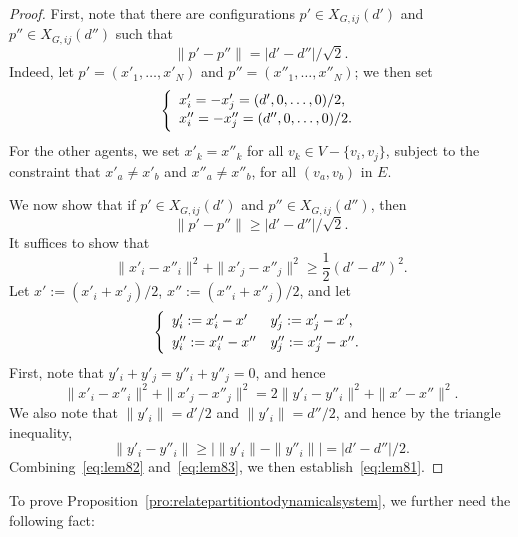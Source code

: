 \documentclass[10pt,twocolumn,twoside]{IEEEtran}
\renewcommand{\(}{\left (}
\renewcommand{\)}{\right )}
\renewcommand{\;}{\,;\,}
\begin{document}
\begin{proof}
First, note that there are configurations $p' \in X_{G,ij}(d')$ and $p''\in X_{G,ij}(d'')$ such that
\begin{equation*}\label{eq:equalitysatisfied}
\|p' - p''\| =  |d' - d''|/ \sqrt{2}.
\end{equation*} 
Indeed, let $p' = (x'_1,\ldots, x'_N)$ and $p'' = (x''_1,\ldots, x''_N)$; we then set
$$
\left\{
\begin{array}{l}
x'_i  =  -x'_j   =  (d', 0, \ldots, 0) / 2, \vspace{1pt}\\
x''_i  =  - x''_j =  (d'',0,\ldots,0) / 2.  \vspace{1pt}\\
\end{array}
\right.
$$ 
For the other agents, we set $x'_k  =  x''_k$  for all  $v_k \in V-\{v_i, v_j\}$, 
subject to the constraint that $x'_{a} \neq x'_{b}$ and $x''_{a}\neq x''_{b}$, for all $(v_{a},v_{b})$ in $E$.


We now show that if $p'\in X_{G,ij}(d')$ and $p'' \in X_{G,ij}(d'')$, then 
$$ \|p' - p''\| \ge |d' - d''|/ \sqrt{2}.$$ 
It suffices to show that 
\begin{equation}\label{eq:lem81}
 \|x'_i - x''_i\|^2 + \|x'_j - x''_j\|^2 \ge \frac{1}{2} (d' - d'')^2.
\end{equation}
Let $x':= (x'_i + x'_j) / 2$,  $x'':= (x''_i + x''_j) / 2$, 
and let 
$$
\left\{
\begin{array}{ll}
y'_i := x'_i - x' & y'_j := x'_j - x', \vspace{3pt}\\
y''_i := x''_i - x'' & y''_j := x''_j - x''.  
\end{array}
\right.
$$
First, note that $ y'_i + y'_j = y''_i + y''_j = 0$, and hence
\begin{equation}\label{eq:lem82}
\|x'_i - x''_i\|^2 + \|x'_j - x''_j\|^2 = 2 \|y'_i - y''_i\|^2 + \|x' - x''\|^2.
\end{equation}
We also note that $\|y'_i\| = d'/2 $ and $\|y'_i\| = d''/2$, and hence by the triangle inequality, 
\begin{equation}\label{eq:lem83}
 \|y'_i - y''_i\| \ge | \|y'_i\| - \|y''_i \||  = |d' - d''|/ 2.  
\end{equation}
Combining~\eqref{eq:lem82} and~\eqref{eq:lem83}, we then establish~\eqref{eq:lem81}. 
\end{proof}

To prove Proposition~\ref{pro:relatepartitiontodynamicalsystem}, we further need the following fact: 
\end{document}
